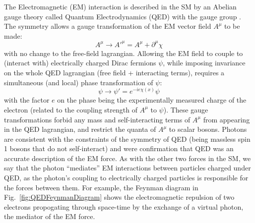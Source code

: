 
The Electromagnetic (EM) interaction is described in the SM by an Abelian gauge theory called Quantum Electrodynamics (QED) with the gauge group \Uone. The \Uone symmetry allows a gauge transformation of the EM vector field $A^{\mu}$ to be made:
\begin{equation}
    A^{\mu} \rightarrow A'^{\mu} = A^{\mu} + \partial^{\mu}\chi
\end{equation}
with no change to the free-field lagrangian. Allowing the EM field to couple to (interact with) electrically charged Dirac fermions $\psi$, while imposing invariance on the whole QED lagrangian (free field + interacting terms), requires a simultaneous (and local) phase transformation of $\psi$:
\begin{equation}
    \psi \rightarrow \psi' = e^{-ie\chi(x)}\psi
\end{equation}
with the factor $e$ on the phase being the experimentally measured charge of the electron (related to the coupling strength of $A^{\mu}$ to $\psi$). These gauge transformations forbid any mass and self-interacting terms of $A^{\mu}$ from appearing in the QED lagrangian, and restrict the quanta of $A^{\mu}$ to scalar bosons. Photons are consistent with the constraints of the \Uone symmetry of QED (being massless spin 1 bosons that do not self-interact) and were confirmation that QED was an accurate description of the EM force. As with the other two forces in the SM, we say that the photon ``mediates'' EM interactions between particles charged under QED, as the photon's coupling to electrically charged particles is responsible for the forces between them. For example, the Feynman diagram in Fig.~\ref{fig:QEDFeynmanDiagram} shows the electromagnetic repulsion of two electrons propogating through space-time by the exchange of a virtual photon, the mediator of the EM force. 
